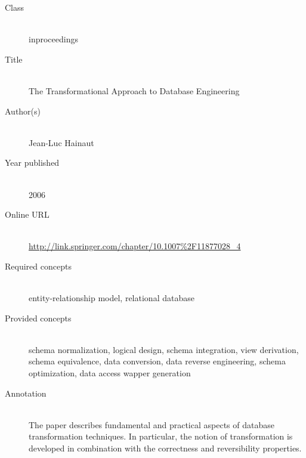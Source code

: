 \begin{description}
\item[Class]\mbox{}\\
inproceedings
\item[Title]\mbox{}\\
The Transformational Approach to Database Engineering
\item[Author(s)]\mbox{}\\
Jean-Luc Hainaut\item[Year published]\mbox{}\\
2006
\item[Online URL]\mbox{}\\
{\footnotesize\url{http://link.springer.com/chapter/10.1007%2F11877028_4}}
\item[Required concepts]\mbox{}\\
entity-relationship model, relational database\item[Provided concepts]\mbox{}\\
schema normalization, logical design, schema integration, view derivation, schema equivalence, data conversion, data reverse engineering, schema optimization, data access wapper generation\item[Annotation]\mbox{}\\
The paper describes fundamental and practical aspects of database transformation techniques. In particular, the notion of transformation is developed in combination with the correctness and reversibility properties.
\end{description}

